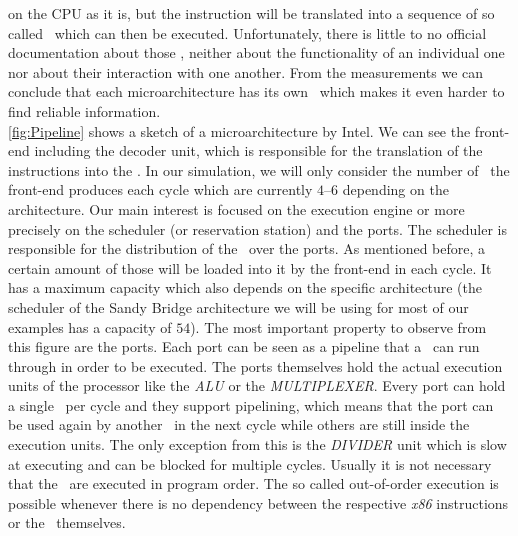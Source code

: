 on the CPU as it is, but the instruction will be translated into a sequence of so called \microops\ which can then be executed. Unfortunately, there is little to no official documentation about those \microops, neither about the functionality of an individual one nor about their interaction with one another. From the measurements we can conclude that each microarchitecture has its own \microops\ which makes it even harder to find reliable information.\\ \autoref{fig:Pipeline} shows a sketch of a microarchitecture by Intel. We can see the front-end including the decoder unit, which is responsible for the translation of the instructions into the \microops. In our simulation, we will only consider the number of \microops\ the front-end produces each cycle which are currently $4$--$6$ depending on the architecture. Our main interest is focused on the execution engine or more precisely on the scheduler (or reservation station) and the ports. The scheduler is responsible for the distribution of the \microops\ over the ports. As mentioned before, a certain amount of those will be loaded into it by the front-end in each cycle. It has a maximum capacity which also depends on the specific architecture (the scheduler of the Sandy Bridge architecture we will be using for most of our examples has a capacity of $54$). The most important property to observe from this figure are the ports. Each port can be seen as a pipeline that a \microop\ can run through in order to be executed. The ports themselves hold the actual execution units of the processor like the \emph{ALU} or the \emph{MULTIPLEXER}. Every port can hold a single \microop\ per cycle and they support pipelining, which means that the port can be used again by another \microop\ in the next cycle while others are still inside the execution units. The only exception from this is the \emph{DIVIDER} unit which is slow at executing and can be blocked for multiple cycles. Usually it is not necessary that the \microops\ are executed in program order. The so called out-of-order execution is possible whenever there is no dependency between the respective \emph{x86} instructions or the \microops\ themselves.
 
 
 
 
